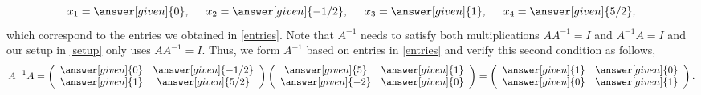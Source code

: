 \documentclass{ximera}
\begin{document}
\begin{example}
\begin{prompt}
\begin{equation}
x_{1} = \answer[given]{0},\hspace{.5cm} x_{2} =\answer[given]{-1/2},\hspace{.5cm} x_{3} = \answer[given]{1},\hspace{.5cm} x_{4} = \answer[given]{5/2},
\end{equation}
which correspond to the entries we obtained in \eqref{entries}. Note that $A^{-1}$ needs to satisfy both multiplications $AA^{-1}=I$ and $A^{-1}A=I$ and our setup in \eqref{setup} only uses $AA^{-1}=I$. Thus, we form $A^{-1}$ based on entries in \eqref{entries} and verify this second condition as follows,
\[A^{-1}A= \left(\begin{array}{cc}
 \answer[given]{0}  & \answer[given]{-1/2} \\
  \answer[given]{1} &  \answer[given]{5/2}
\end{array}\right)
\left(\begin{array}{cc}
 \answer[given]{5}  & \answer[given]{1} \\
  \answer[given]{-2} &  \answer[given]{0}
\end{array}\right) = \left(\begin{array}{cc}
 \answer[given]{1}  & \answer[given]{0} \\
  \answer[given]{0} &  \answer[given]{1}
\end{array}\right).
\]
\end{prompt}
\end{example}
\end{document}
